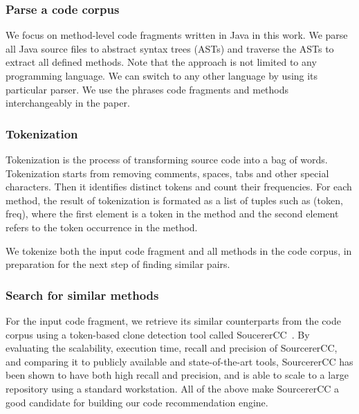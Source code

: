 \subsubsection{Parse a code corpus}
We focus on method-level code fragments written in Java in this work. We parse all Java source files to abstract syntax trees (ASTs) and traverse the ASTs to extract all defined methods. Note that the approach is not limited to any programming language. We can switch to any other language by using its particular parser. We use the phrases code fragments and methods interchangeably in the paper.

\subsubsection{Tokenization}
Tokenization is the process of transforming source code into a bag of words. Tokenization starts from removing comments, spaces, tabs and other special characters. Then it identifies distinct tokens and count their frequencies. For each method, the result of tokenization is formated as a list of tuples such as {\ttt (token, freq)}, where the first element is a token in the method and the second element refers to the token occurrence in the method.

We tokenize both the input code fragment and all methods in the code corpus, in preparation for the next step of finding similar pairs.

\subsubsection{Search for similar methods}
For the input code fragment, we retrieve its similar counterparts from the code corpus using a token-based clone detection tool called SoucererCC~\cite{sajnani2016sourcerercc}. By evaluating the scalability, execution time, recall and precision of SourcererCC, and comparing it to publicly available and state-of-the-art tools, SourcererCC has been shown to have both high recall and precision, and is able to scale to a large repository using a standard workstation. All of the above make SourcererCC a good candidate for building our code recommendation engine. 


